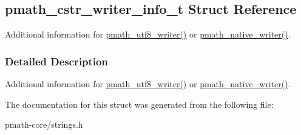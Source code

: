 \hypertarget{structpmath__cstr__writer__info__t}{
\subsection{pmath\_\-cstr\_\-writer\_\-info\_\-t Struct Reference}
\label{structpmath__cstr__writer__info__t}
}
Additional information for \hyperlink{group__strings_g5e7a9b1a5eb8861e94dc1bea92c77424}{pmath\_\-utf8\_\-writer()} or \hyperlink{group__strings_ga3ecac6a71274a3e43cedadb10085f2b}{pmath\_\-native\_\-writer()}.  




\subsubsection{Detailed Description}
Additional information for \hyperlink{group__strings_g5e7a9b1a5eb8861e94dc1bea92c77424}{pmath\_\-utf8\_\-writer()} or \hyperlink{group__strings_ga3ecac6a71274a3e43cedadb10085f2b}{pmath\_\-native\_\-writer()}. 

The documentation for this struct was generated from the following file:\begin{CompactItemize}
\item 
pmath-core/strings.h\end{CompactItemize}
